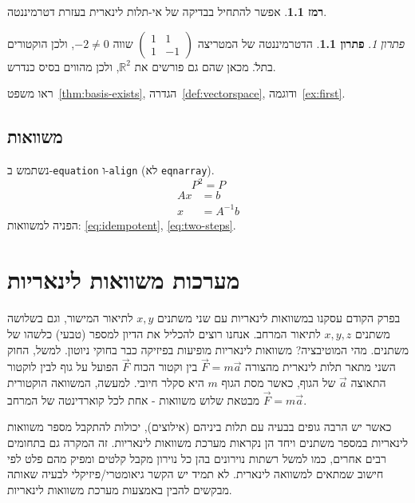 \documentclass[
  hebrew,
  12pt,
  a4paper,
  oneside]{book}
\theoremstyle{definition}
\theoremstyle{remark}
\theoremstyle{plain}
\theoremstyle{remark}
\newtheorem*{solution}{פתרון}
\begin{document}
\textbf{רמז 1.1}. אפשר להתחיל בבדיקה של אי-תלות לינארית בעזרת דטרמיננטה.

\begin{solution}
\textbf{פתרון 1.1}. הדטרמיננטה של המטריצה
\(\begin{pmatrix}1&1\\ 1&-1\end{pmatrix}\) שווה \(-2\neq 0\), ולכן
הוקטורים בתל̈. מכאן שהם גם פורשים את \(\mathbb{R}^2\), ולכן מהווים בסיס
כנדרש.
\end{solution}

ראו משפט~\ref{thm:basis-exists}, הגדרה~\ref{def:vectorspace},
ודוגמה~\ref{ex:first}.

\section{משוואות}\label{ux5deux5e9ux5d5ux5d5ux5d0ux5d5ux5ea}

נשתמש ב-\texttt{equation} ו-\texttt{align} (לא \texttt{eqnarray}).
\[\label{eq:idempotent}
P^2 = P\] \[\begin{aligned}
\label{eq:two-steps}
Ax &= b\\
x  &= A^{-1}b
\end{aligned}\] הפניה למשוואות: \eqref{eq:idempotent},
\eqref{eq:two-steps}.

\backmatter


\chapter{מערכות משוואות
לינאריות}\label{ux5deux5e2ux5e8ux5dbux5d5ux5ea-ux5deux5e9ux5d5ux5d5ux5d0ux5d5ux5ea-ux5dcux5d9ux5e0ux5d0ux5e8ux5d9ux5d5ux5ea}

בפרק הקודם עסקנו במשוואות לינאריות עם שני משתנים \(x,y\) לתיאור המישור,
וגם בשלושה משתנים \(x,y,z\) לתיאור המרחב. אנחנו רוצים להכליל את הדיון
למספר (טבעי) כלשהו של משתנים. מהי המוטיבציה? משוואות לינאריות מופיעות
בפיזיקה כבר בחוקי ניוטון. למשל, החוק השני מתאר תלות לינארית מהצורה
\(\vec{F}=m\vec{a}\) בין וקטור הכוח \(\vec{F}\) הפועל על גוף לבין לוקטור
התאוצה \(\vec{a}\) של הגוף, כאשר מסת הגוף \(m\) היא סקלר חיובי. למעשה,
המשוואה הוקטורית \(\vec{F}=m\vec{a}\) מבטאת שלוש משוואות - אחת לכל
קוארדינטה של המרחב.

כאשר יש הרבה גופים בבעיה עם תלות ביניהם (אילוצים), יכולות להתקבל מספר
משוואות לינאריות במספר משתנים ויחד הן נקראות מערכת משוואות לינאריות. זה
המקרה גם בתחומים רבים אחרים, כמו למשל רשתות נוירונים בהן כל נוירון מקבל
קלטים ומפיק מהם פלט לפי חישוב שמתאים למשוואה לינארית. לא תמיד יש הקשר
גיאומטרי/פיזיקלי לבעיה שאותה מבקשים להבין באמצעות מערכת משוואות
לינאריות.
\end{document}
